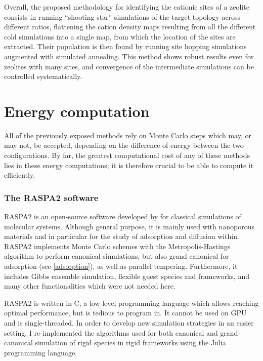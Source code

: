\documentclass[main.tex]{subfiles}
\begin{document}
Overall, the proposed methodology for identifying the cationic sites of a zeolite consists in running ``shooting star'' simulations of the target topology across different \SiAl ratios, flattening the cation density maps resulting from all the different cold simulations into a single map, from which the location of the sites are extracted. Their population is then found by running site hopping simulations augmented with simulated annealing. This method shows robust results even for zeolites with many sites, and convergence of the intermediate simulations can be controlled systematically.

\section{Energy computation}\label{energy_computation}

All of the previously exposed methods rely on Monte Carlo steps which may, or may not, be accepted, depending on the difference of energy between the two configurations. By far, the greatest computational cost of any of these methods lies in these energy computations; it is therefore crucial to be able to compute it efficiently.

\subsubsection{The RASPA2 software}

RASPA2 is an open-source software developed by \textcite{RASPA} for classical simulations of molecular systems. Although general purpose, it is mainly used with nanoporous materials and in particular for the study of adsorption and diffusion within. RASPA2 implements Monte Carlo schemes with the Metropolis-Hastings algorithm to perform canonical simulations, but also grand canonical for adsorption (see \cref{adsorption}), as well as parallel tempering. Furthermore, it includes Gibbs ensemble simulation, flexible guest species and frameworks, and many other functionalities which were not needed here.

RASPA2 is written in C, a low-level programming language which allows reaching optimal performance, but is tedious to program in. It cannot be used on GPU and is single-threaded. In order to develop new simulation strategies in an easier setting, I re-implemented the algorithms used for both canonical and grand-canonical simulation of rigid species in rigid frameworks using the Julia programming language\autocite{Julia,JuliaDesign}.
\end{document}
